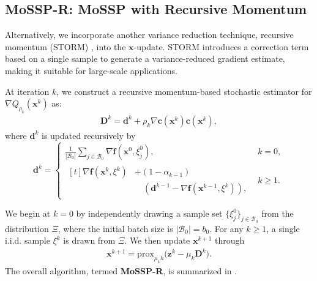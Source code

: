 \documentclass{article}
\theoremstyle{plain}
\theoremstyle{definition}
\theoremstyle{remark}
\newcommand{\prox}{\mathrm{prox}}
\newcommand{\bx}{\bm{x}}
\newcommand{\bc}{\bm{c}}
\newcommand{\bz}{\bm{z}}
\newcommand{\bd}{\bm{d}}
\newcommand{\calB}{\mathcal{B}}
\newcommand{\bD}{\bm{D}}
\newcommand{\tf}{\mathbf{f}}
\numberwithin{equation}{section}
\begin{document}
\subsection{MoSSP-R: MoSSP with Recursive Momentum}
\label{Subsection: Recursive-momentum based algorithm and its main complexity results}
Alternatively, we incorporate another variance reduction technique, recursive momentum (STORM) \cite{cutkosky2019momentum}, into the \(\bx\)-update. STORM introduces a correction term based on a single sample to generate a variance-reduced gradient estimate, making it suitable for large-scale applications.

At iteration \(k\), we construct a recursive momentum-based stochastic estimator for \(\nabla Q_{\rho_k}(\bx^k)\) as: 
\begin{align}
    \label{Eq: gradient estimator storm}
    \bD^k = \bd^k + \rho_k \nabla \bc(\bx^{k}) \bc(\bx^{k}),
\end{align}
where \(\bd^k\) is updated recursively by
\begin{equation}
\label{Eq: the storm estimator}
\bd^k =
\begin{cases}
\frac{1}{|\calB_0|} \sum_{j \in \calB_0}
\nabla \tf(\bx^0,\xi_j^0), & k = 0, \\[3pt]
\begin{aligned}[t]
\nabla \tf(\bx^k, \xi^k)
&+ (1 - \alpha_{k-1}) \\
&\quad \left( \bd^{k-1} - \nabla \tf(\bx^{k-1},\xi^k) \right),
\end{aligned} & k \geq 1.
\end{cases}
\end{equation}

We begin at $k=0$ by independently drawing a sample set $\{\xi_j^0\}_{j\in\mathcal{B}_0}$ from the distribution $\Xi$, where the initial batch size is $|\mathcal{B}_0|=b_0$. For any \(k\ge1\), a single i.i.d. sample \(\xi^k\) is drawn from \(\Xi\). We then update \(\bx^{k+1}\) through
\begin{align}
\label{eq:bx_update_storm}
    \bx^{k+1} 
    = \prox_{\mu_k h}\bigl(\bz^k - \mu_k \bD^{k}\bigr).
\end{align}
The overall algorithm, termed \textbf{MoSSP-R}, is summarized in .
\end{document}
